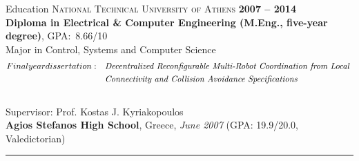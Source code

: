 \documentclass[11pt]{resume}
\begin{document}
\begin{category}{Education}
\newline
\textsc{National Technical University of Athens} \hfill  \textbf{2007 --  2014} \\
\textbf{Diploma in Electrical \& Computer Engineering (M.Eng., five-year degree)}, \mbox{GPA: 8.66/10} \\ %
Major in Control, Systems and Computer Science\\
\begin{align*}
&Final year dissertation: 				&&\emph{Decentralized Reconfigurable Multi-Robot Coordination
	from Local }\\
&\phantom{Final year dissertation:}         &&\emph{Connectivity and Collision Avoidance Specifications}
\end{align*}\\
Supervisor: Prof. Kostas J. Kyriakopoulos \\

\newline
\textbf{Agios Stefanos High School}, Greece, \emph{June 2007} (GPA: 19.9/20.0, Valedictorian) 

\noindent\rule{\textwidth}{0.2pt}
\end{category}
\end{document}
